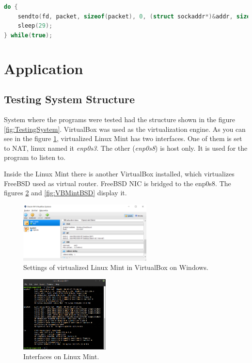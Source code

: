 \documentclass[10pt,a4paper,titlepage]{article}
\begin{document}
            \begin{lstlisting}[language=c, basicstyle=\tiny]
do {
    sendto(fd, packet, sizeof(packet), 0, (struct sockaddr*)&addr, sizeof(address));
    sleep(29);
} while(true);
            \end{lstlisting}
    
    \newpage
    \section{Application}
        
        \subsection{Testing System Structure}
            System where the programs were tested had the structure shown in the figure \ref{fig:TestingSystem}.
            VirtualBox was used as the virtualization engine. As you can see in the figure \ref{fig:VBWinMint},
            virtualized Linux Mint has two interfaces. One of them is set to NAT, linux named it {\it enp0s3}.
            The other ({\it enp0s8}) is host only. It is used for the program to listen to.

            Inside the Linux Mint there is another VirtualBox installed, which virtualizes FreeBSD used as virtual
            router. FreeBSD NIC is bridged to the enp0s8. The figures \ref{fig:MintIfconfig}
            and \ref{fig:VBMintBSD} display it.

            \begin{figure}[h!]
                \begin{center}
                    \includegraphics[width=0.60\textwidth]{winmint.png}
                    \caption{Settings of virtualized Linux Mint in VirtualBox on Windows. \label{fig:VBWinMint}}
                \end{center}
            \end{figure}

            \begin{figure}[h!]
                \begin{center}
                    \includegraphics[width=0.40\textwidth]{mintifconfig.png}
                    \caption{Interfaces on Linux Mint. \label{fig:MintIfconfig}}
                \end{center}
            \end{figure}
\end{document}

